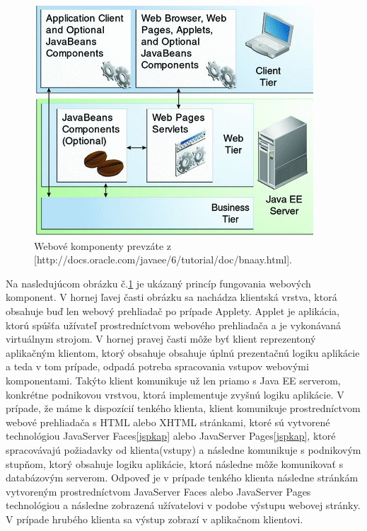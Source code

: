 \begin{figure}[htb]

\begin{center}

\includegraphics[scale=0.5]{webtechnology.jpg} 
\caption{Webové komponenty prevzáte z [http://docs.oracle.com/javaee/6/tutorial/doc/bnaay.html]. }
\label{web}

\end{center}

\end{figure}
Na nasledujúcom obrázku č.\ref{web} je ukázaný princíp fungovania webových komponent. V hornej ľavej časti obrázku sa nachádza klientská vrstva, ktorá obsahuje buď len webový prehliadač po prípade Applety. Applet je aplikácia, ktorú spúšťa užívateľ prostredníctvom webového prehliadača a je vykonávaná virtuálnym strojom. V hornej pravej časti môže byť klient reprezentoný aplikačným klientom, ktorý obsahuje obsahuje úplnú prezentačnú logiku aplikácie a teda v tom prípade, odpadá potreba spracovania vstupov webovými komponentami. Takýto klient komunikuje už len priamo s Java EE serverom, konkrétne podnikovou vrstvou, ktorá implementuje zvyšnú logiku aplikácie. V prípade, že máme k dispozícií tenkého klienta, klient komunikuje prostredníctvom webové prehliadača s HTML alebo XHTML stránkami, ktoré sú vytvorené technológiou JavaServer Faces\ref{jspkap} alebo JavaServer Pages\ref{jspkap}, ktoré spracovávajú požiadavky od klienta(vstupy) a následne komunikuje s podnikovým stupňom, ktorý obsahuje logiku aplikácie, ktorá následne môže komunikovať s databázovým serverom. Odpoveď je v prípade tenkého klienta následne  stránkám vytvoreným prostredníctvom JavaServer Faces alebo JavaServer Pages technológiou a následne zobrazená užívatelovi v podobe výstupu webovej stránky. V prípade hrubého klienta sa výstup zobrazí v aplikačnom klientovi.


